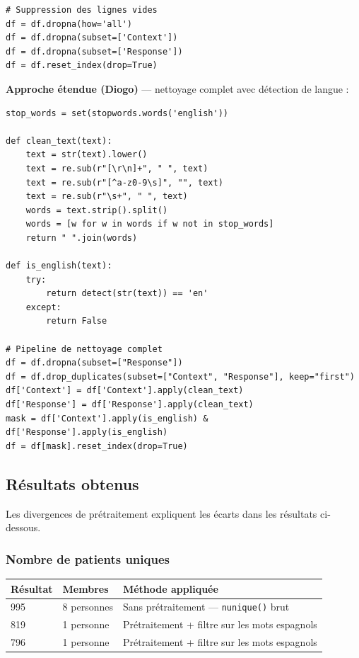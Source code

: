 \documentclass[12pt,a4paper]{article}
\begin{document}
\begin{lstlisting}
# Suppression des lignes vides
df = df.dropna(how='all')
df = df.dropna(subset=['Context'])
df = df.dropna(subset=['Response'])
df = df.reset_index(drop=True)
\end{lstlisting}

\textbf{Approche étendue (Diogo)} --- nettoyage complet avec détection de langue :

\begin{lstlisting}
stop_words = set(stopwords.words('english'))

def clean_text(text):
    text = str(text).lower()
    text = re.sub(r"[\r\n]+", " ", text)
    text = re.sub(r"[^a-z0-9\s]", "", text)
    text = re.sub(r"\s+", " ", text)
    words = text.strip().split()
    words = [w for w in words if w not in stop_words]
    return " ".join(words)

def is_english(text):
    try:
        return detect(str(text)) == 'en'
    except:
        return False

# Pipeline de nettoyage complet
df = df.dropna(subset=["Response"])
df = df.drop_duplicates(subset=["Context", "Response"], keep="first")
df['Context'] = df['Context'].apply(clean_text)
df['Response'] = df['Response'].apply(clean_text)
mask = df['Context'].apply(is_english) & df['Response'].apply(is_english)
df = df[mask].reset_index(drop=True)
\end{lstlisting}

\subsection{Résultats obtenus}

Les divergences de prétraitement expliquent les écarts dans les résultats ci-dessous.

\subsubsection*{Nombre de patients uniques}

\begin{center}
\begin{tabular}{lll}
\toprule
\textbf{Résultat} & \textbf{Membres} & \textbf{Méthode appliquée} \\
\midrule
995 & 8 personnes & Sans prétraitement --- \texttt{nunique()} brut \\
819 & 1 personne  & Prétraitement + filtre sur les mots espagnols \\
796 & 1 personne  & Prétraitement + filtre sur les mots espagnols \\
\bottomrule
\end{tabular}
\end{center}
\end{document}
